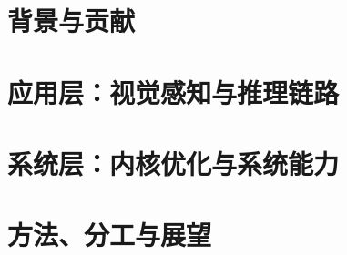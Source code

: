 \documentclass[11pt,a4paper]{ctexart}
\begin{document}


\clearpage
{\small\tableofcontents}
\clearpage

\part{背景与贡献}




\clearpage
\part{应用层：视觉感知与推理链路}




\clearpage
\part{系统层：内核优化与系统能力}












\clearpage
\part{方法、分工与展望}





\end{document}
